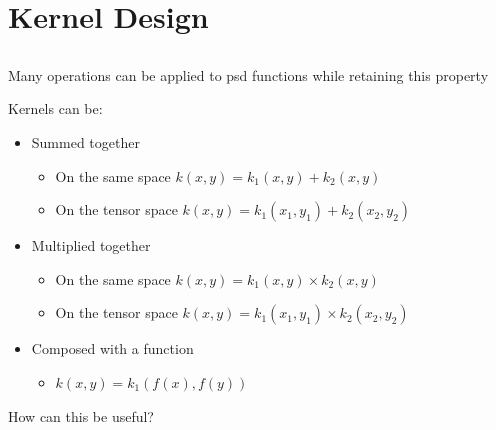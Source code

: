 \documentclass{beamer}
\begin{document}
\section{Kernel Design}
\subsection{}

\begin{frame}{}
Many operations can be applied to psd functions while retaining this property
\begin{block}{}
Kernels can be:
\begin{itemize}
  \item Summed together
  \begin{itemize}
    \item On the same space $k(x,y) = k_1(x,y) + k_2(x,y)$
    \item On the tensor space $k(x,y) = k_1(x_1,y_1) + k_2(x_2,y_2)$
  \end{itemize}
  \item Multiplied together
  \begin{itemize}
    \item On the same space $k(x,y) = k_1(x,y) \times k_2(x,y)$
    \item On the tensor space $k(x,y) = k_1(x_1,y_1) \times k_2(x_2,y_2)$
  \end{itemize}
  \item Composed with a function
  \begin{itemize}
    \item $k(x,y) = k_1(f(x),f(y))$
  \end{itemize}
\end{itemize}
\end{block}
\begin{center}
\alert{How can this be useful?}
\end{center}
\end{frame}

\end{document}
